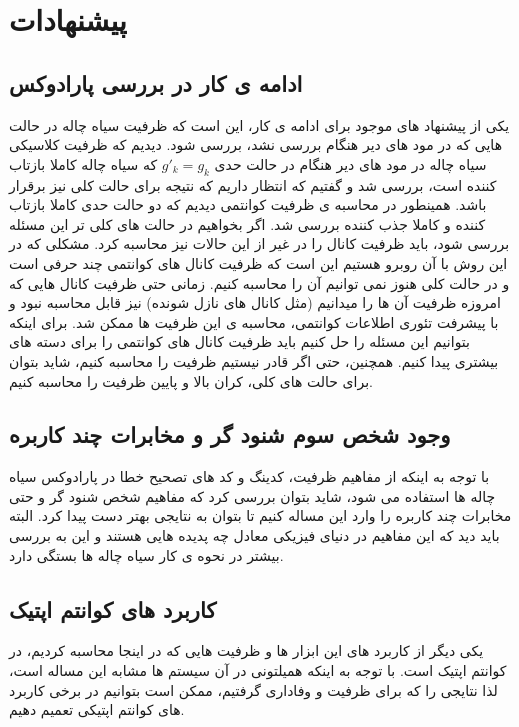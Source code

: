 \section{پیشنهادات}
\subsection{ادامه ی کار در بررسی پارادوکس}
یکی از پیشنهاد های موجود برای ادامه ی کار، این است که ظرفیت سیاه چاله در حالت هایی که در مود های دیر هنگام بررسی نشد، بررسی شود. دیدیم که ظرفیت کلاسیکی سیاه چاله در مود های دیر هنگام در حالت حدی
$g'_k = g_k$
که سیاه چاله کاملا بازتاب کننده است،
بررسی شد و گفتیم که انتظار داریم که نتیجه برای حالت کلی نیز برقرار باشد. همینطور در محاسبه ی ظرفیت کوانتمی دیدیم که دو حالت حدی کاملا بازتاب کننده و کاملا جذب کننده بررسی شد. اگر بخواهیم در حالت های کلی تر این مسئله بررسی شود، باید ظرفیت کانال را در غیر از این حالات نیز محاسبه کرد. مشکلی که  در این روش با آن روبرو هستیم این است که ظرفیت کانال های کوانتمی چند حرفی است و در حالت کلی هنوز نمی توانیم آن را محاسبه کنیم. زمانی حتی ظرفیت کانال هایی که امروزه ظرفیت آن ها را میدانیم (مثل کانال های نازل شونده)
نیز قابل محاسبه نبود و با پیشرفت تئوری اطلاعات کوانتمی، محاسبه ی این ظرفیت ها ممکن شد. برای اینکه بتوانیم این مسئله را حل کنیم باید ظرفیت کانال های کوانتمی را برای دسته های بیشتری پیدا کنیم. همچنین، حتی اگر قادر نیستیم ظرفیت را محاسبه کنیم، شاید بتوان برای حالت های کلی، کران بالا و پایین ظرفیت را محاسبه کنیم.
\subsection{وجود شخص سوم شنود گر و مخابرات چند کاربره}
با توجه به اینکه از مفاهیم ظرفیت، کدینگ و کد های تصحیح خطا در پارادوکس سیاه چاله ها استفاده می شود، شاید بتوان بررسی کرد که مفاهیم شخص شنود گر و حتی مخابرات چند کاربره را وارد این مساله کنیم تا بتوان به نتایجی بهتر دست پیدا کرد. البته باید دید که این مفاهیم در دنیای فیزیکی معادل چه پدیده هایی هستند و این به بررسی بیشتر در نحوه ی کار سیاه چاله ها بستگی دارد.
\subsection{کاربرد های کوانتم اپتیک}
یکی دیگر از کاربرد های  این ابزار ها و ظرفیت هایی که در اینجا محاسبه کردیم، در کوانتم اپتیک است. با توجه به اینکه همیلتونی در آن سیستم ها مشابه این مساله است، لذا نتایجی  را که برای ظرفیت و وفاداری گرفتیم، ممکن است بتوانیم در برخی کاربرد های کوانتم اپتیکی تعمیم دهیم.
